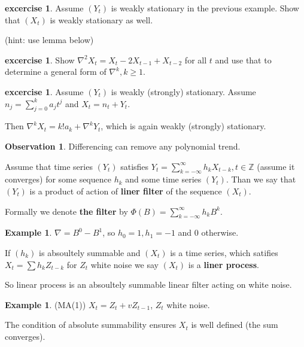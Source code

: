 \documentclass[12pt,a4paper]{amsart}
\theoremstyle{definition} %
\newtheorem{example}[defn]{Example}
\newtheorem{excercise}[defn]{excercise}
\newtheorem{observation}[defn]{Observation}
\theoremstyle{plain} %
\newcommand{\Z}{\mathbb Z}
\begin{document}
\begin{excercise}
Assume $(Y_t)$ is weakly stationary in the previous example. Show that $(X_t)$ is weakly stationary as well.

(hint: use lemma below)
\end{excercise}

\begin{excercise}
Show 
$\nabla^2 X_t = X_t - 2X_{t-1} + X_{t-2}$ for all $t$ and use that to determine a general form of $\nabla^k, k \geq 1$.
\end{excercise}


\begin{excercise}
Assume $(Y_t)$ is weakly (strongly) stationary. Assume $n_j = \sum_{j=0}^k a_j t^j$ and $X_t = n_t + Y_t$.

Then 
$\nabla^k X_t = k! a_k + \nabla^k Y_t$, which is again weakly (strongly) stationary.  
\end{excercise}

\begin{observation}
Differencing can remove any polynomial trend. 
\end{observation}


Assume that time series $(Y_t)$ satisfies 
$Y_t = \sum_{k = -\infty}^\infty h_k X_{t-k}, t \in \Z$ (assume it converges) for some sequence $h_k$ and some time series $(Y_t)$. Than we say that $(Y_t)$ is a product of action of {\bf  liner filter} of the sequence $(X_t)$.  

Formally we denote {\bf the filter } by $\Phi(B) =  \sum_{k = -\infty}^\infty h_k B^k$.

\begin{example}
$\nabla = B^0 - B^1$, so $h_0 = 1, h_1 = -1$ and $0$ otherwise.

\end{example}

If $(h_k)$ is absoultely summable and $(X_t)$ is a time series, which satifies $X_t = \sum h_k Z_{t-k}$ for $Z_t$ white noise we say $(X_t)$ is a {\bf liner process}. 

So linear process is an absoultely summable linear filter acting on white noise. 



\begin{example}(MA(1))
$X_t = Z_t + v Z_{t-1}$, $Z_t$ white noise.
\end{example}


The condition of absolute summability ensures $X_t$ is well defined (the sum converges).
\end{document}
